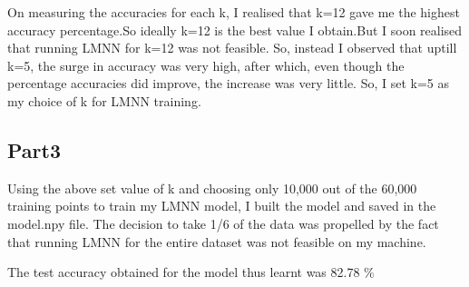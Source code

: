 \documentclass[a4paper,11pt]{article}
\begin{document}
\begin{mlsolution}
On measuring the accuracies for each k, I realised that k=12 gave me the highest accuracy percentage.So ideally k=12 is the best value I obtain.But I soon realised that running LMNN for k=12 was not feasible. So, instead I observed that uptill k=5, the surge in accuracy was very high, after which, even though the percentage accuracies did improve, the increase was very little. So, I set k=5 as my choice of k for LMNN training.

\subsection*{Part3}
Using the above set value of k and choosing only 10,000 out of the 60,000 training points to train my LMNN model, I built the model and saved in the model.npy file. The decision to take 1/6 of the data was propelled by the fact that running LMNN for the entire dataset was not feasible on my machine.

The test accuracy obtained for the model thus learnt was 82.78 \%







\end{mlsolution}			
					
\end{document}
